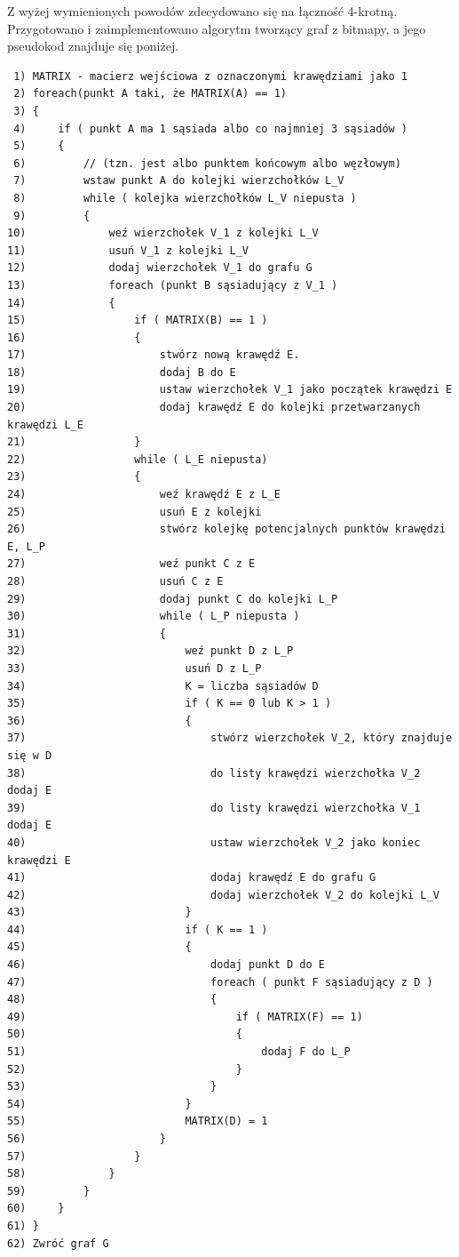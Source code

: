 \documentclass[a4paper,11pt,twoside]{report}
\theoremstyle{definition}
\begin{document}
\bigskip

Z wyżej wymienionych powodów zdecydowano się na łączność 4-krotną. Przygotowano i zaimplementowano algorytm tworzący graf z bitmapy, a jego pseudokod znajduje się poniżej. %

\begin{verbatim}
 1) MATRIX - macierz wejściowa z oznaczonymi krawędziami jako 1
 2) foreach(punkt A taki, że MATRIX(A) == 1)
 3) {
 4)     if ( punkt A ma 1 sąsiada albo co najmniej 3 sąsiadów )
 5)     { 
 6)         // (tzn. jest albo punktem końcowym albo węzłowym)
 7)         wstaw punkt A do kolejki wierzchołków L_V
 8)         while ( kolejka wierzchołków L_V niepusta )
 9)         {
10)             weź wierzchołek V_1 z kolejki L_V
11)             usuń V_1 z kolejki L_V
12)             dodaj wierzchołek V_1 do grafu G
13)             foreach (punkt B sąsiadujący z V_1 )
14)             {
15)                 if ( MATRIX(B) == 1 )
16)                 {
17)                     stwórz nową krawędź E.  
18)                     dodaj B do E 
19)                     ustaw wierzchołek V_1 jako początek krawędzi E
20)                     dodaj krawędź E do kolejki przetwarzanych krawędzi L_E
21)                 }
22)                 while ( L_E niepusta)
23)                 {
24)                     weź krawędź E z L_E
25)                     usuń E z kolejki
26)                     stwórz kolejkę potencjalnych punktów krawędzi E, L_P
27)                     weź punkt C z E
28)                     usuń C z E
29)                     dodaj punkt C do kolejki L_P
30)                     while ( L_P niepusta ) 
31)                     {
32)                         weź punkt D z L_P 
33)                         usuń D z L_P
34)                         K = liczba sąsiadów D
35)                         if ( K == 0 lub K > 1 )
36)                         {
37)                             stwórz wierzchołek V_2, który znajduje się w D
38)                             do listy krawędzi wierzchołka V_2 dodaj E
39)                             do listy krawędzi wierzchołka V_1 dodaj E
40)                             ustaw wierzchołek V_2 jako koniec krawędzi E
41)                             dodaj krawędź E do grafu G
42)                             dodaj wierzchołek V_2 do kolejki L_V
43)                         }
44)                         if ( K == 1 )
45)                         {
46)                             dodaj punkt D do E
47)                             foreach ( punkt F sąsiadujący z D )
48)                             {
49)                                 if ( MATRIX(F) == 1)
50)                                 {
51)                                     dodaj F do L_P
52)                                 }
53)                             }
54)                         }
55)                         MATRIX(D) = 1
56)                     }
57)                 }
58)             }
59)         }
60)     }
61) }
62) Zwróć graf G
\end{verbatim}
\end{document}

